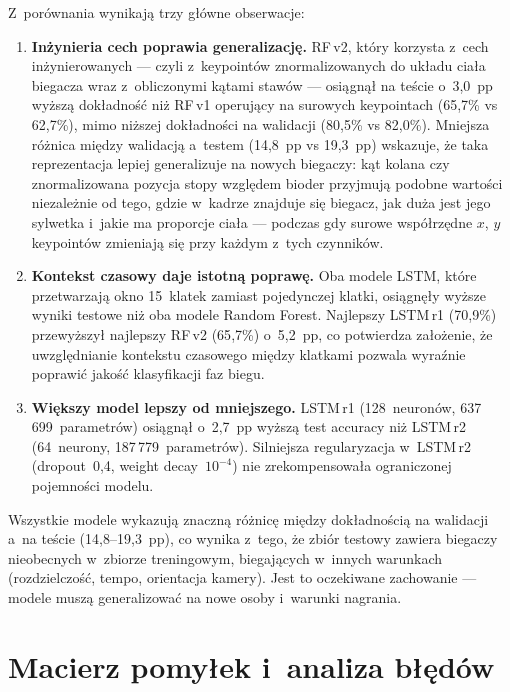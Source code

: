 Z~porównania wynikają trzy główne obserwacje:

\begin{enumerate}
    \item \textbf{Inżynieria cech poprawia generalizację.} RF\,v2, który korzysta z~cech inżynierowanych --- czyli z~keypointów znormalizowanych do układu ciała biegacza wraz z~obliczonymi kątami stawów --- osiągnął na teście o~3{,}0~pp wyższą dokładność niż RF\,v1 operujący na surowych keypointach (65{,}7\% vs 62{,}7\%), mimo niższej dokładności na walidacji (80{,}5\% vs 82{,}0\%). Mniejsza różnica między walidacją a~testem (14{,}8~pp vs 19{,}3~pp) wskazuje, że taka reprezentacja lepiej generalizuje na nowych biegaczy: kąt kolana czy znormalizowana pozycja stopy względem bioder przyjmują podobne wartości niezależnie od tego, gdzie w~kadrze znajduje się biegacz, jak duża jest jego sylwetka i~jakie ma proporcje ciała --- podczas gdy surowe współrzędne $x$, $y$ keypointów zmieniają się przy każdym z~tych czynników.

    \item \textbf{Kontekst czasowy daje istotną poprawę.} Oba modele LSTM, które przetwarzają okno 15~klatek zamiast pojedynczej klatki, osiągnęły wyższe wyniki testowe niż oba modele Random Forest. Najlepszy LSTM\,r1 (70{,}9\%) przewyższył najlepszy RF\,v2 (65{,}7\%) o~5{,}2~pp, co potwierdza założenie, że uwzględnianie kontekstu czasowego między klatkami pozwala wyraźnie poprawić jakość klasyfikacji faz biegu.

    \item \textbf{Większy model lepszy od mniejszego.} LSTM\,r1 (128~neuronów, 637\,699~parametrów) osiągnął o~2{,}7~pp wyższą test accuracy niż LSTM\,r2 (64~neurony, 187\,779~parametrów). Silniejsza regularyzacja w~LSTM\,r2 (dropout~0{,}4, weight decay~$10^{-4}$) nie zrekompensowała ograniczonej pojemności modelu.
\end{enumerate}

Wszystkie modele wykazują znaczną różnicę między dokładnością na walidacji a~na teście (14{,}8--19{,}3~pp), co wynika z~tego, że zbiór testowy zawiera biegaczy nieobecnych w~zbiorze treningowym, biegających w~innych warunkach (rozdzielczość, tempo, orientacja kamery). Jest to oczekiwane zachowanie --- modele muszą generalizować na nowe osoby i~warunki nagrania.
\newpage
\section{Macierz pomyłek i~analiza błędów}
\label{sec:confusion-matrices}

